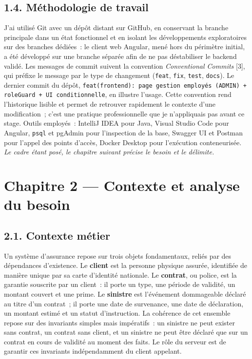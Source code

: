 \documentclass[12pt,a4paper]{report}
\begin{document}
\section*{1.4. Méthodologie de travail}
J'ai utilisé Git avec un dépôt distant sur GitHub, en conservant la branche principale dans un état fonctionnel et en isolant les développements exploratoires sur des branches dédiées~: le client web Angular, mené hors du périmètre initial, a été développé sur une branche séparée afin de ne pas déstabiliser le backend validé. Les messages de commit suivent la convention \textit{Conventional Commits} [3], qui préfixe le message par le type de changement (\texttt{feat}, \texttt{fix}, \texttt{test}, \texttt{docs}). Le dernier commit du dépôt, \texttt{feat(frontend): page gestion employés (ADMIN) + roleGuard + UI conditionnelle}, en illustre l'usage. Cette convention rend l'historique lisible et permet de retrouver rapidement le contexte d'une modification~; c'est une pratique professionnelle que je n'appliquais pas avant ce stage.
Outils employés~: IntelliJ IDEA pour Java, Visual Studio Code pour Angular, \texttt{psql} et pgAdmin pour l'inspection de la base, Swagger UI et Postman pour l'appel des points d'accès, Docker Desktop pour l'exécution conteneurisée.
\textit{Le cadre étant posé, le chapitre suivant précise le besoin et le délimite.}
\newpage
\chapter*{Chapitre 2 — Contexte et analyse du besoin}
\section*{2.1. Contexte métier}
Un système d'assurance repose sur trois objets fondamentaux, reliés par des dépendances d'existence. Le \textbf{client} est la personne physique assurée, identifiée de manière unique par sa carte d'identité nationale. Le \textbf{contrat}, ou police, est la garantie souscrite par un client~: il porte un type, une période de validité, un montant couvert et une prime. Le \textbf{sinistre} est l'événement dommageable déclaré au titre d'un contrat~; il porte une date de survenance, une date de déclaration, un montant estimé et un statut d'instruction.
La cohérence de cet ensemble repose sur des invariants simples mais impératifs~: un sinistre ne peut exister sans contrat, un contrat sans client, et un sinistre ne peut être déclaré que sur un contrat en cours de validité au moment des faits. Le rôle du serveur est de garantir ces invariants indépendamment du client appelant.
\end{document}
